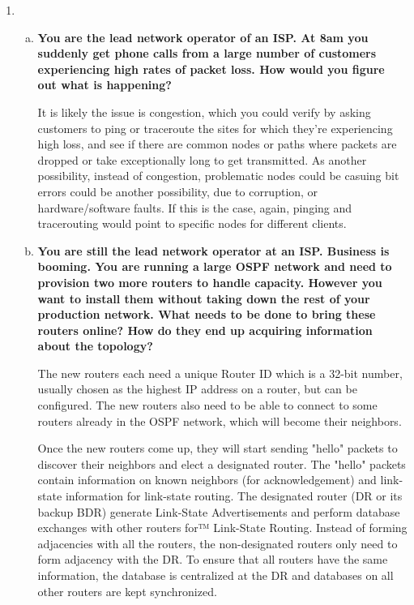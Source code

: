 \documentclass[11pt]{article}
\begin{document}
\begin{enumerate}[1.]

\item %
  \begin{enumerate}[(a)]  
  \item 
  \textbf{
    You are the lead network operator of an ISP. At 8am you suddenly get phone calls from a large number of customers experiencing high rates of packet loss. 
    How would you figure out what is happening? 
  } 

  It is likely the issue is congestion, which you could verify by asking customers to ping or traceroute the sites for which they're experiencing high loss, and see if there are common nodes or paths where packets are dropped or take exceptionally long to get transmitted. As another possibility, instead of congestion, problematic nodes could be casuing bit errors could be another possibility, due to corruption, or hardware/software faults. If this is the case, again, pinging and tracerouting would point to specific nodes for different clients.

  \item 
  \textbf{
    You are still the lead network operator at an ISP. Business is booming. You are running a large OSPF network and need to provision two more routers to handle capacity. However you want to install them without taking down the rest of your production network. What needs to be done to bring these routers online? How do they end up acquiring information about the topology? 
  } 

  The new routers each need a unique Router ID which is a 32-bit number, usually chosen as the highest IP address on a router, but can be configured. The new routers also need to be able to connect to some routers already in the OSPF network, which will become their neighbors. 

  Once the new routers come up, they will start sending "hello" packets to discover their neighbors and elect a designated router. The "hello" packets contain information on known neighbors (for acknowledgement) and link-state information for link-state routing. The designated router (DR or its backup BDR) generate Link-State Advertisements and perform database exchanges with other routers for™ Link-State Routing. Instead of forming adjacencies with all the routers, the non-designated routers only need to form adjacency with the DR. To ensure that all routers have the same information, the database is centralized at the DR and databases on all other routers are kept synchronized.
  \end{enumerate}


\end{enumerate}
\end{document}
